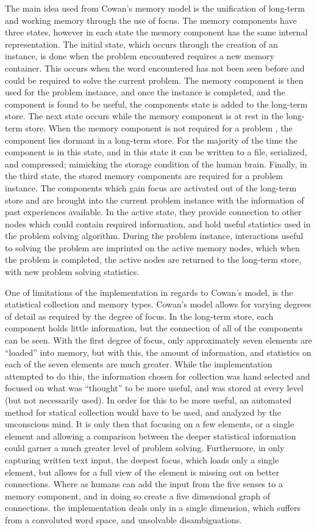The main idea used from Cowan's memory model is the unification of long-term and
working memory through the use of focus.  The memory components have three
states, however in each state the memory component has the same internal
representation. The initial state, which occurs through the creation of an
instance, is done when the problem encountered requires a new memory container.
This occurs when the word encountered has not been seen before and could be
required to solve the current problem. The memory component is then used for the
problem instance, and once the instance is completed, and the component is found
to be useful, the components state is added to the long-term store. The next
state occurs while the memory component is at rest in the long-term store. When
the memory component is not required for a problem , the component lies dormant
in a long-term store. For the majority of the time the component is in this
state, and in this state it can be written to a file, serialized, and
compressed; mimicking the storage condition of the human brain. Finally, in the
third state, the stored memory components are required for a problem instance.
The components which gain focus are activated out of the long-term store and are
brought into the current problem instance with the information of past
experiences available. In the active state, they provide connection to other
nodes which could contain required information, and hold useful statistics used
in the problem solving algorithm.  During the problem instance, interactions
useful to solving the problem are imprinted on the active memory nodes, which
when the problem is completed, the active nodes are returned to the long-term
store, with new problem solving statistics.

One of limitations of the implementation in regards to Cowan's model, is the
statistical collection and memory types.  Cowan's model allows for varying
degrees of detail as required by the degree of focus.  In the long-term store,
each component holds little information, but the connection of all of the
components can be seen.  With the first degree of focus, only approximately
seven elements are ``loaded'' into memory, but with this, the amount of
information, and statistics on each of the seven elements are much greater.
While the implementation attempted to do this, the information chosen for
collection was hand selected and focused on what was ``thought'' to be more
useful, and was stored at every level (but not necessarily used).  In order for
this to be more useful, an automated method for statical collection would have
to be used, and analyzed by the unconscious mind.  It is only then that focusing
on a few elements, or a single element and allowing a comparison between the
deeper statistical information could garner a much greater level of problem
solving. Furthermore, in only capturing written text input, the deepest focus,
which loads only a single element, but allows for a full view of the element is
missing out on better connections.  Where as humans can add the input from the
five senses to a memory component, and in doing so create a five dimensional
graph of connections. the implementation deals only in a single dimension, which
suffers from a convoluted word space, and unsolvable disambiguations.

